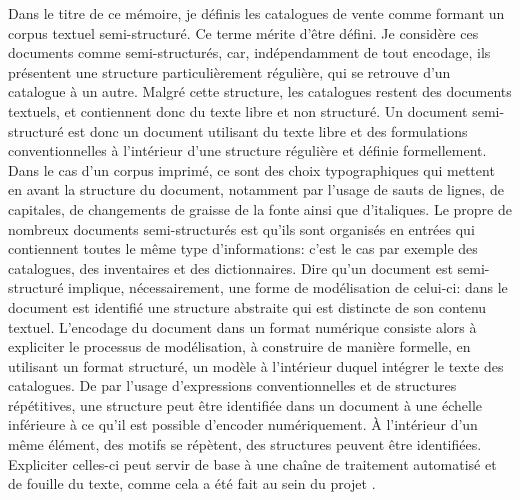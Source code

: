 Dans le titre de ce mémoire, je définis les catalogues de vente comme formant un corpus textuel semi-structuré. Ce terme mérite d'être défini. Je considère ces documents comme semi-structurés, car, indépendamment de tout encodage, ils présentent une structure particulièrement régulière, qui se retrouve d'un catalogue à un autre. Malgré cette structure, les catalogues restent des documents textuels, et contiennent donc du texte libre et non structuré. Un document semi-structuré est donc un document utilisant du texte libre et des formulations conventionnelles à l'intérieur d'une structure régulière et définie formellement. Dans le cas d'un corpus imprimé, ce sont des choix typographiques qui mettent en avant la structure du document, notamment par l'usage de sauts de lignes, de capitales, de changements de graisse de la fonte ainsi que d'italiques. Le propre de nombreux documents semi-structurés est qu'ils sont organisés en entrées qui contiennent toutes le même type d'informations: c'est le cas par exemple des catalogues, des inventaires et des dictionnaires. Dire qu'un document est semi-structuré implique, nécessairement, une forme de modélisation de celui-ci: dans le document est identifié une structure abstraite qui est distincte de son contenu textuel. L'encodage du document dans un format numérique consiste alors à expliciter le processus de modélisation, à construire de manière formelle, en utilisant un format structuré, un modèle à l'intérieur duquel intégrer le texte des catalogues. De par l'usage d'expressions conventionnelles et de structures répétitives, une structure peut être identifiée dans un document à une échelle inférieure à ce qu'il est possible d'encoder numériquement. À l'intérieur d'un même élément, des motifs se répètent, des structures peuvent être identifiées. Expliciter celles-ci peut servir de base à une chaîne de traitement automatisé et de fouille du texte, comme cela a été fait au sein du projet \mssktb{}.


